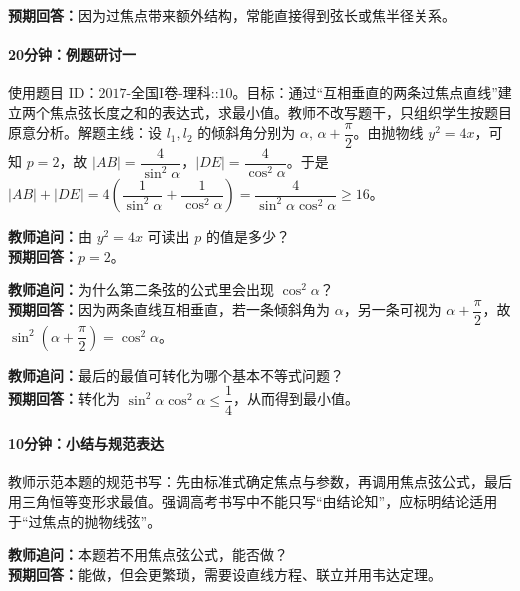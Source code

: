 \documentclass[UTF8,a4paper,11pt]{ctexart}
\begin{document}
\textbf{预期回答：}因为过焦点带来额外结构，常能直接得到弦长或焦半径关系。\par

\paragraph{20分钟：例题研讨一}

使用题目 ID：$\text{2017-全国I卷-理科::10}$。目标：通过“互相垂直的两条过焦点直线”建立两个焦点弦长度之和的表达式，求最小值。教师不改写题干，只组织学生按题目原意分析。解题主线：设 $l_1,l_2$ 的倾斜角分别为 $\alpha,\,\alpha+\dfrac\pi2$。由抛物线 $y^2=4x$，可知 $p=2$，故 $|AB|=\dfrac{4}{\sin^2\alpha}$，$|DE|=\dfrac{4}{\cos^2\alpha}$。于是
$|AB|+|DE|=4\left(\dfrac{1}{\sin^2\alpha}+\dfrac{1}{\cos^2\alpha}\right)=\dfrac{4}{\sin^2\alpha\cos^2\alpha}\ge 16$。

\noindent\textbf{教师追问：}由 $y^2=4x$ 可读出 $p$ 的值是多少？\\

\textbf{预期回答：}$p=2$。\par

\noindent\textbf{教师追问：}为什么第二条弦的公式里会出现 $\cos^2\alpha$？\\

\textbf{预期回答：}因为两条直线互相垂直，若一条倾斜角为 $\alpha$，另一条可视为 $\alpha+\dfrac\pi2$，故 $\sin^2\left(\alpha+\dfrac\pi2\right)=\cos^2\alpha$。\par

\noindent\textbf{教师追问：}最后的最值可转化为哪个基本不等式问题？\\

\textbf{预期回答：}转化为 $\sin^2\alpha\cos^2\alpha\le \dfrac14$，从而得到最小值。\par

\paragraph{10分钟：小结与规范表达}

教师示范本题的规范书写：先由标准式确定焦点与参数，再调用焦点弦公式，最后用三角恒等变形求最值。强调高考书写中不能只写“由结论知”，应标明结论适用于“过焦点的抛物线弦”。

\noindent\textbf{教师追问：}本题若不用焦点弦公式，能否做？\\

\textbf{预期回答：}能做，但会更繁琐，需要设直线方程、联立并用韦达定理。\par
\end{document}
